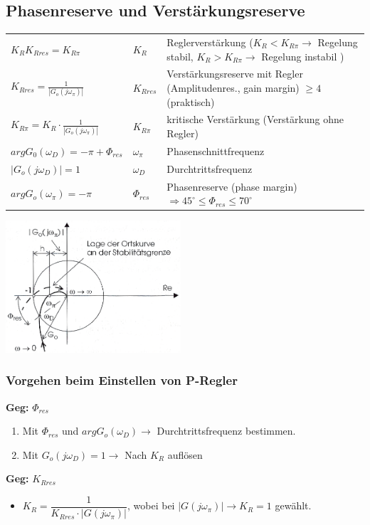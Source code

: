 		
	\subsection{Phasenreserve und Verstärkungsreserve }
		\begin{tabular}{l|ll}
			$K_RK_{Rres}=K_{R\pi}$ & $K_R$ & Reglerverstärkung ($K_R < K_{R\pi} \rightarrow$ Regelung stabil, $K_R > K_{R\pi} \rightarrow$ Regelung
			instabil	) \\
			$K_{Rres}=\frac{1}{\left| G_o(j\omega_{\pi})\right|}$ & $K_{Rres}$ & 	Verstärkungsreserve mit Regler (Amplitudenres., gain margin) $\geq 4$ (praktisch) \\
			$K_{R\pi} = K_R \cdot \frac{1}{|G_o(j\omega_\pi)|}$ & $K_{R\pi}$ & kritische Verstärkung (Verstärkung ohne Regler) \\
			$argG_0(\omega_D)=-\pi+\Phi_{res}$ & $\omega_\pi$ & Phasenschnittfrequenz\\
			$|G_o(j\omega_D)|=1$ & $\omega_D$ & Durchtrittsfrequenz \\
			$argG_o(\omega_\pi)=-\pi$ & $\Phi_{res}$ & Phasenreserve (phase margin) $\Rightarrow 45^{\circ} \leq \Phi_{res} \leq 70^{\circ}$
		\end{tabular}
		\begin{minipage}{7cm}
			\includegraphics[width=6.5cm]{./images/phasenreserve.png}
		\end{minipage}
		\begin{minipage}{11cm}
			\subsubsection{Vorgehen beim Einstellen von P-Regler }
			\textbf{Geg:} $\Phi_{res}$
			\begin{enumerate}
				\item Mit $\Phi_{res}$ und $argG_o(\omega_D) \rightarrow$ Durchtrittsfrequenz bestimmen.
				\item Mit $G_o(j\omega_D) = 1 \rightarrow$  Nach $K_{R}$ auflösen 
			\end{enumerate}
			\vspace{0.5cm}
			\textbf{Geg:} $K_{Rres}$
			\begin{itemize}
				\item $K_R = \dfrac{1}{K_{Rres} \cdot |G(j\omega_\pi)|}$, wobei bei $|G(j\omega_\pi)| \rightarrow K_R = 1$ gewählt.
			\end{itemize}
			
		\end{minipage}
        
